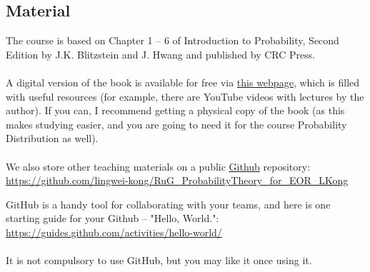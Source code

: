 \documentclass[openany]{article}
\begin{document}
\subsection{Material}
The course is based on Chapter 1 – 6 of Introduction to Probability, Second Edition by J.K. Blitzstein and J. Hwang and published by CRC Press. \\~\\
A digital version of the book is available for free via \href{https://projects.iq.harvard.edu/stat110/home}{this webpage}, which
is filled with useful resources (for example, there are YouTube videos with
lectures by the author). If you can, I recommend getting a physical copy of
the book (as this makes studying easier, and you are going to need it for the course Probability Distribution as well). \\~\\
We also store other teaching materials on a public \href{https://github.com/}{Github} repository:\\ \href{https://github.com/lingwei-kong/RuG_ProbabilityTheory_for_EOR_LKong}{https://github.com/lingwei-kong/RuG\_ProbabilityTheory\_for\_EOR\_LKong}

GitHub is a handy tool for collaborating with your teams, and here is one starting guide for your Github -- "Hello, World.":
\href{https://guides.github.com/activities/hello-world/}{https://guides.github.com/activities/hello-world/} \\~\\
It is not compulsory to use GitHub, but you may like it once using it.
\end{document}
